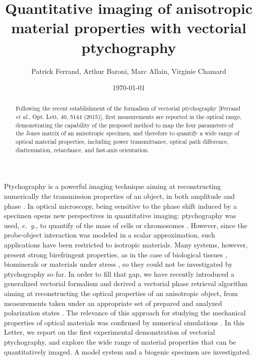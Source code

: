\documentclass[aps,prl,twocolumn,amsmath]{revtex4-1}
\begin{document}
\title{Quantitative imaging of anisotropic material properties with vectorial ptychography}
\author{Patrick Ferrand, Arthur Baroni, Marc Allain, Virginie Chamard}
\address{Aix-Marseille Univ, CNRS, Centrale Marseille, Institut Fresnel, F-13013 Marseille, France}
\date{\today}

\begin{abstract}
Following the recent establishment of the formalism of vectorial ptychography [Ferrand \emph{et al.}, Opt. Lett. 40, 5144 (2015)], first measurements are reported in the optical range, demonstrating the capability of the proposed method to map the four parameters of the Jones matrix of an anisotropic specimen, and therefore to quantify a wide range of optical material properties, including power transmittance, optical path difference, diattenuation, retardance, and fast-axis orientation.
\end{abstract}


\maketitle



Ptychography is a powerful imaging technique aiming at reconstructing numerically the transmission properties of an object, in both amplitude and phase \cite{Faulkner04}. In optical microscopy, being sensitive to the phase shift induced by a specimen opens new perspectives in quantitative imaging: ptychography was used, \emph{e.~g.}, to quantify of the mass of cells \cite{Marrison13} or chromosomes \cite{Shemilt15}. However, since the probe-object interaction was modeled in a scalar approximation, such applications have been restricted to isotropic materials. Many systems, however, present strong birefringent properties, as in the case of biological tissues \cite{Wolman86}, biominerals \cite{metzler2017} or materials under stress \cite{Anthony2016SR}, so they could not be investigated by ptychography so far. In order to fill that gap, we have recently introduced a generalized vectorial formalism and derived a vectorial phase retrieval algorithm aiming at reconstructing the optical properties of an anisotropic object, from measurements taken under an appropriate set of prepared and analyzed polarization states \cite{Ferrand15}. The relevance of this approach for studying the mechanical properties of optical materials was confirmed by numerical simulations \cite{Anthony2016SPIE}. In this Letter, we report on the first experimental demonstration of vectorial ptychography, and explore the wide range of material properties that can be quantitatively imaged. A model system and a biogenic specimen are investigated.
\end{document}
